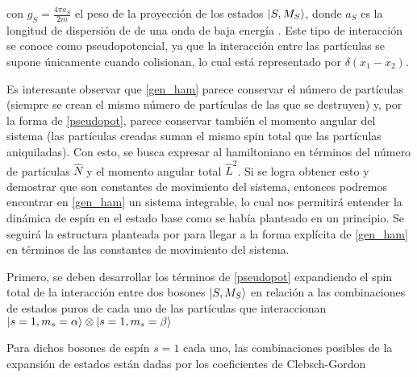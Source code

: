 con $g_S = \frac{4\pi a_S}{2m}$ el peso de la proyección de los estados $\left|S,M_S\right\rangle$, donde $a_S$ es la longitud de dispersión de de una onda de baja energía \cite{s-wave}. %
Este tipo de interacción se conoce como pseudopotencial, ya que la interacción entre las partículas se supone únicamente cuando colisionan, lo cual está representado por $\delta(x_1-x_2)$. 
 

Es interesante observar que \ref{gen_ham} parece conservar el número de partículas (siempre se crean el mismo número de partículas de las que se destruyen) y, por la forma de \ref{pseudopot}, parece conservar también el momento angular del sistema (las partículas creadas suman el mismo spin total que las partículas aniquiladas). %
Con esto, se busca expresar al hamiltoniano en términos del número de partículas $\hat{N}$ y el momento angular total $\hat{L}^2$. Si se logra obtener esto y demostrar que son constantes de movimiento del sistema, entonces podremos encontrar en \ref{gen_ham} un sistema integrable, lo cual nos permitirá entender la dinámica de espín en el estado base como se había planteado en un principio. Se seguirá la estructura planteada por \cite{law98} para llegar a la forma explícita de \ref{gen_ham} en términos de las constantes de movimiento del sistema. 

Primero, se deben desarrollar los términos de \ref{pseudopot} expandiendo el spin total de la interacción entre dos bosones $\left|S,M_S\right\rangle$ en relación a las combinaciones de estados puros de cada uno de las partículas que interaccionan $\left|s=1,m_s=\alpha\right\rangle \mathbin{\mathop{\otimes}} \left|s=1,m_s=\beta\right\rangle$

Para dichos bosones de espín $s=1$ cada uno, las combinaciones posibles de la expansión de estados están dadas por los coeficientes de Clebsch-Gordon \cite{griffiths}

